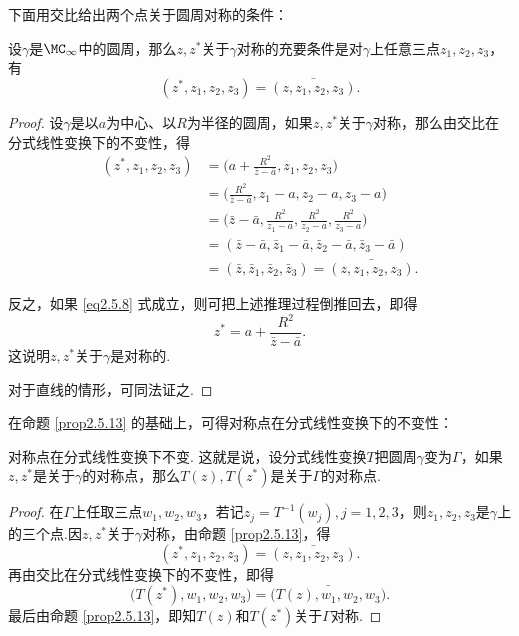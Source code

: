 下面用交比给出两个点关于圆周对称的条件：
\begin{prop}\label{prop2.5.13}
  设$\gamma$是$\MC_\infty$中的圆周，那么$z,z^\ast$关于$\gamma$对称的充要条件是对$\gamma$上任意三点$z_1,z_2,z_3$，有
  \begin{equation}\label{eq2.5.8}
    (z^\ast,z_1,z_2,z_3) = \bar{(z,z_1,z_2,z_3)}.
  \end{equation}
\end{prop}
\begin{proof}
  设$\gamma$是以$a$为中心、以$R$为半径的圆周，如果$z,z^\ast$关于$\gamma$对称，那么由交比在分式线性变换下的不变性，得
  \begin{align*}
    (z^\ast,z_1,z_2,z_3)&=\bigg(a+\frac{R^2}{\bar z-\bar a},z_1,z_2,z_3\bigg)\\
    & = \bigg(\frac{R^2}{\bar z-\bar a},z_1-a,z_2-a,z_3-a\bigg)\\
    & = \bigg(\bar z-\bar a,\frac{R^2}{z_1-a},\frac{R^2}{z_2-a},\frac{R^2}{z_3-a}\bigg)\\
    & = (\bar z-\bar a,\bar z_1-\bar a,\bar z_2-\bar a,\bar z_3-\bar a)\\
    & = (\bar z,\bar z_1,\bar z_2,\bar z_3)=\bar{(z,z_1,z_2,z_3)}.
  \end{align*}

  反之，如果 \eqref{eq2.5.8} 式成立，则可把上述推理过程倒推回去，即得
  \[
    z^\ast = a + \frac{R^2}{\bar z - \bar a}.
  \]
  这说明$z,z^\ast$关于$\gamma$是对称的.

  对于直线的情形，可同法证之.
\end{proof}

在命题 \ref{prop2.5.13} 的基础上，可得对称点在分式线性变换下的不变性：
\begin{theorem}\label{thm2.5.14}
  对称点在分式线性变换下不变. 这就是说，设分式线性变换$T$把圆周$\gamma$变为$\Gamma$，如果$z,z^\ast$是关于$\gamma$的对称点，那么$T(z),T(z^\ast)$是关于$\Gamma$的对称点.
\end{theorem}
\begin{proof}
  在$\Gamma$上任取三点$w_1,w_2,w_3$，若记$z_j=T^{-1}(w_j),j=1,2,3$，则$z_1,z_2,z_3$是$\gamma$上的三个点.因$z,z^\ast$关于$\gamma$对称，由命题 \ref{prop2.5.13}，得
  \[
    (z^\ast,z_1,z_2,z_3) = \bar{(z,z_1,z_2,z_3)}.
  \]
  再由交比在分式线性变换下的不变性，即得
  \[
  \big(T(z^\ast),w_1,w_2,w_3\big) = \bar{\big(T(z),w_1,w_2,w_3\big)}.
  \]
  最后由命题 \ref{prop2.5.13}，即知$T(z)$和$T(z^\ast)$关于$\Gamma$对称.
\end{proof}


